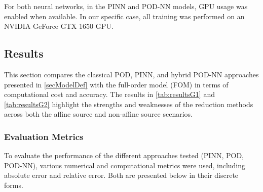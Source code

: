 \documentclass[
    conference,
    nofonttune,
    11pt
]{IEEEtran}
\begin{document}
                For both neural networks, in the PINN and POD-NN models, GPU usage was enabled when available. In our specific case, all training was performed on an NVIDIA GeForce GTX 1650 GPU.

        \subsection{Results}\label{results}

            This section compares the classical POD, PINN, and hybrid POD-NN approaches presented in \autoref{secModelDef} with the full-order model (FOM) in terms of computational cost and accuracy. The results in \autoref{tab:resultsG1} and \autoref{tab:resultsG2} highlight the strengths and weaknesses of the reduction methods across both the affine source and non-affine source scenarios.

            \subsubsection{Evaluation Metrics}

                To evaluate the performance of the different approaches tested (PINN, POD, POD-NN), various numerical and computational metrics were used, including absolute error and relative error. Both are presented below in their discrete forms.
                
\end{document}
